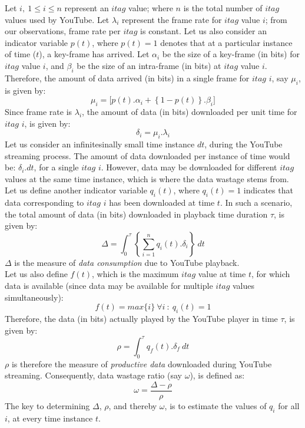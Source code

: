 Let $i,\ 1 \leq i \leq n$ represent an $itag$ value; where $n$ is the total number of $itag$ values used by YouTube.
Let $\lambda_i$ represent the frame rate for $itag$ value $i$; from our observations, frame rate per $itag$ is constant. 
Let us also consider an indicator variable $p(t)$, where $p(t)=1$ denotes that at a particular instance of time ($t$), a key-frame has arrived.
Let $\alpha_i$ be the size of a key-frame (in bits) for $itag$ value $i$, and $\beta_i$ be the size of an intra-frame (in bits) at $itag$ value $i$.
Therefore, the amount of data arrived (in bits) in a single frame for $itag$ $i$, say $\mu_{i}$, is given by:
\begin{equation}
 \mu_i = \lbrack p(t).\alpha_i + \left\{1-p(t)\right\}.\beta_i \rbrack
\end{equation}
Since frame rate is $\lambda_i$, the amount of data (in bits) downloaded per unit time for $itag$ $i$, is given by:
\begin{equation}
 \delta_i = \mu_i.\lambda_i
\end{equation}
Let us consider an infinitesinally small time instance $dt$, during the YouTube streaming process. The amount of data downloaded per instance of time would be: $\delta_i.dt$, for a single $itag$ $i$.
However, data may be downloaded for different $itag$ values at the same time instance, which is where the data wastage stems from.
Let us define another indicator variable $q_{i}(t)$, where $q_{i}(t)=1$ indicates that data corresponding to $itag$ $i$ has been downloaded at time $t$.
In such a scenario, the total amount of data (in bits) downloaded in playback time duration $\tau$, is given by:
\begin{equation}
 \Delta = \int_{0}^{\tau} \left\{\sum_{i=1}^{n} q_{i}(t).\delta_{i}\right\}\ dt %
\end{equation}
$\Delta$ is the measure of {\it data consumption} due to YouTube playback.\\
Let us also define $f(t)$, which is the maximum $itag$ value at time $t$, for which data is available (since data may be available for multiple $itag$ values simultaneously):
\begin{equation}
 f(t) = max\{i\}\ \forall i\ :\ q_{i}(t) = 1
\end{equation}
Therefore, the data (in bits) actually played by the YouTube player in time $\tau$, is given by:
\begin{equation}
 \rho = \int_{0}^{\tau} q_{f}(t).\delta_{f}\ dt
\end{equation}
$\rho$ is therefore the measure of {\it productive data} downloaded during YouTube streaming.
Consequently, data wastage ratio (say $\omega$), is defined as:
\begin{equation}
 \omega = \frac{\Delta - \rho}{\rho}
\end{equation}
The key to determining $\Delta$, $\rho$, and thereby $\omega$, is to estimate the values of $q_{i}$ for all $i$, at every time instance $t$.

